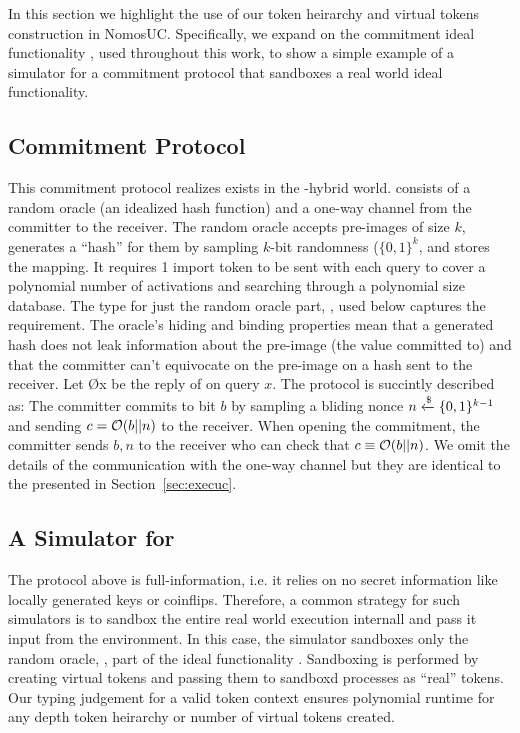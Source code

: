 In this section we highlight the use of our token heirarchy and virtual tokens construction in NomosUC.
Specifically, we expand on the commitment ideal functionality \Fcom, used throughout this work, to show a simple example of a simulator for a commitment protocol that sandboxes a real world ideal functionality. 

\subsection{Commitment Protocol}
This commitment protocol realizes \Fcom exists in the \Fropp-hybrid world. \Fropp consists of a random oracle (an idealized hash function) and a one-way channel from the committer to the receiver. 
The random oracle accepts pre-images of size $k$, generates a ``hash'' for them by sampling $k$-bit randomness ($\{0,1\}^k$, and stores the mapping.
It requires 1 import token to be sent with each query to cover a polynomial number of activations and searching through a polynomial size database. The type for just the random oracle part, \Fro, used below captures the requirement. 
The oracle's hiding and binding properties mean that a generated hash does not leak information about the pre-image (the value committed to)  and that the committer can't equivocate on the pre-image on a hash sent to the receiver. 
Let \O{x} be the reply of \Fropp on query $x$. The protocol is succintly described as: 
The committer commits to bit $b$ by sampling a bliding nonce $n \xleftarrow{\$} \{0,1\}^{k-1}$ and sending $c = \mathcal{O}(b || n)$ to the receiver. When opening the commitment, the committer sends $b, n$ to the receiver who can check that $c \equiv \mathcal{O}(b || n)$.
We omit the details of the communication with the one-way channel but they are identical to the \Fauth presented in Section~\ref{sec:execuc}.

\subsection{A Simulator for \Fcom}
The protocol above is full-information, i.e. it relies on no secret information like locally generated keys or coinflips. 
Therefore, a common strategy for such simulators is to sandbox the entire real world execution internall and pass it input from the environment.
In this case, the simulator \simcom sandboxes only the random oracle, \Fro, part of the ideal functionality \Fropp.
Sandboxing is performed by creating virtual tokens and passing them to sandboxd processes as ``real'' tokens. 
Our typing judgement for a valid token context ensures polynomial runtime for any depth token heirarchy or number of virtual tokens created. 

